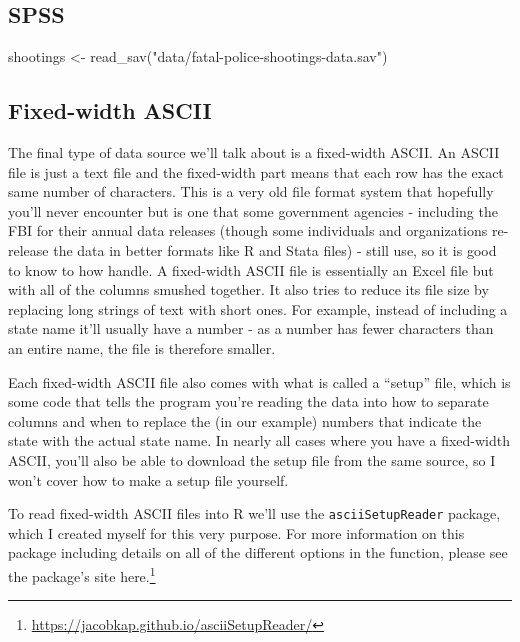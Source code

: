\documentclass[
]{krantz}
\makeatletter
\newenvironment{Shaded}{\begin{snugshade}}{\end{snugshade}}
\newcommand{\FunctionTok}[1]{\textcolor[rgb]{0,0,0}{#1}}
\newcommand{\NormalTok}[1]{#1}
\newcommand{\OtherTok}[1]{\textcolor[rgb]{0.37,0.37,0.37}{#1}}
\newcommand{\StringTok}[1]{\textcolor[rgb]{0.5,0.5,0.5}{#1}}
\renewcommand{\href}[2]{#2\footnote{\url{#1}}}
\newenvironment{kframe}{%
\medskip{}
\setlength{\fboxsep}{.8em}
 \def\at@end@of@kframe{}%
 \ifinner\ifhmode%
  \def\at@end@of@kframe{\end{minipage}}%
  \begin{minipage}{\columnwidth}%
 \fi\fi%
 \def\FrameCommand##1{\hskip\@totalleftmargin \hskip-\fboxsep
 \colorbox{shadecolor}{##1}\hskip-\fboxsep
     \hskip-\linewidth \hskip-\@totalleftmargin \hskip\columnwidth}%
 \MakeFramed {\advance\hsize-\width
   \@totalleftmargin\z@ \linewidth\hsize
   \@setminipage}}%
 {\par\unskip\endMakeFramed%
 \at@end@of@kframe}
\renewenvironment{Shaded}{\begin{kframe}}{\end{kframe}}
\makeatother
\begin{document}
\hypertarget{spss}{%
\subsection{SPSS}\label{spss}}

\begin{Shaded}
\begin{Highlighting}[]
\NormalTok{shootings }\OtherTok{\textless{}{-}} \FunctionTok{read\_sav}\NormalTok{(}\StringTok{"data/fatal{-}police{-}shootings{-}data.sav"}\NormalTok{)}
\end{Highlighting}
\end{Shaded}

\hypertarget{fixed-width-ascii}{%
\subsection{Fixed-width ASCII}\label{fixed-width-ascii}}

The final type of data source we'll talk about is a
fixed-width ASCII. An ASCII file is just a text file and the
fixed-width part means that each row has the exact same
number of characters. This is a very old file format system
that hopefully you'll never encounter but is one that some
government agencies - including the FBI for their annual
data releases (though some individuals and organizations
re-release the data in better formats like R and Stata
files) - still use, so it is good to know to how handle. A
fixed-width ASCII file is essentially an Excel file but with
all of the columns smushed together. It also tries to reduce
its file size by replacing long strings of text with short
ones. For example, instead of including a state name it'll
usually have a number - as a number has fewer characters
than an entire name, the file is therefore smaller.

Each fixed-width ASCII file also comes with what is called a
``setup'' file, which is some code that tells the program
you're reading the data into how to separate columns and
when to replace the (in our example) numbers that indicate
the state with the actual state name. In nearly all cases
where you have a fixed-width ASCII, you'll also be able to
download the setup file from the same source, so I won't
cover how to make a setup file yourself.

To read fixed-width ASCII files into R we'll use the
\texttt{asciiSetupReader} package, which I created myself
for this very purpose. For more information on this package
including details on all of the different options in the
function, please see the package's site
\href{https://jacobkap.github.io/asciiSetupReader/}{here.}
\end{document}
